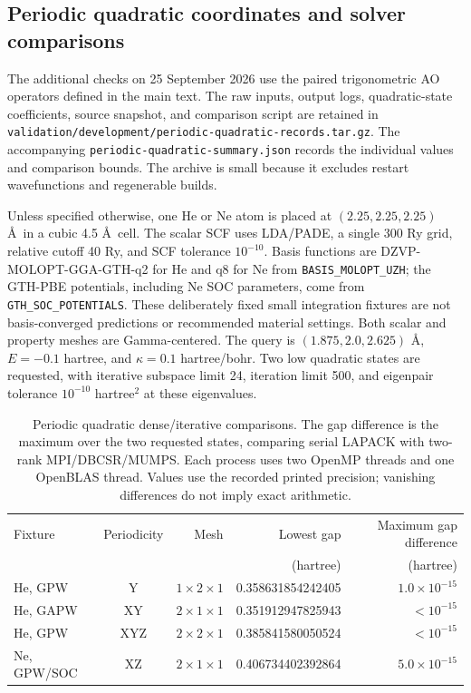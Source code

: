 \documentclass[11pt]{article}
\begin{document}
\subsection{Periodic quadratic coordinates and solver comparisons}
\label{sec:si-periodic-quadratic}
The additional checks on 25 September 2026 use the paired
trigonometric AO operators defined in the main text.
The raw inputs, output logs, quadratic-state coefficients,
source snapshot, and comparison script are retained in
\nolinkurl{validation/development/periodic-quadratic-records.tar.gz}.
The accompanying \texttt{periodic-quadratic-summary.json} records
the individual values and comparison bounds. The archive is small
because it excludes restart wavefunctions and regenerable builds.

Unless specified otherwise, one He or Ne atom is placed at
$(2.25,2.25,2.25)$ \AA\ in a cubic 4.5 \AA\ cell. The scalar SCF
uses LDA/PADE, a single 300 Ry grid, relative cutoff 40 Ry, and
SCF tolerance $10^{-10}$. Basis functions are
DZVP-MOLOPT-GGA-GTH-q2 for He and q8 for Ne from
\texttt{BASIS\_MOLOPT\_UZH}; the GTH-PBE potentials, including
Ne SOC parameters, come from \texttt{GTH\_SOC\_POTENTIALS}.
These deliberately fixed small integration fixtures are not
basis-converged predictions or recommended material settings.
Both scalar and property meshes are Gamma-centered.
The query is $(1.875,2.0,2.625)$ \AA, $E=-0.1$ hartree, and
$\kappa=0.1$ hartree/bohr. Two low quadratic states are requested,
with iterative subspace limit 24, iteration limit 500, and
eigenpair tolerance $10^{-10}$ hartree$^2$ at these eigenvalues.

\begin{table}[htbp]
\centering\small
\setlength{\tabcolsep}{4pt}
\begin{tabular}{lcrrr}
\toprule
Fixture & Periodicity & Mesh & Lowest gap & Maximum gap difference\\
 & & & (hartree) & (hartree)\\
\midrule
He, GPW & Y & $1\times2\times1$ & 0.358631854242405 & $1.0\times10^{-15}$\\
He, GAPW & XY & $2\times1\times1$ & 0.351912947825943 & $<10^{-15}$\\
He, GPW & XYZ & $2\times2\times1$ & 0.385841580050524 & $<10^{-15}$\\
Ne, GPW/SOC & XZ & $2\times1\times1$ & 0.406734402392864 & $5.0\times10^{-15}$\\
\bottomrule
\end{tabular}
\caption{Periodic quadratic dense/iterative comparisons. The gap
difference is the maximum over the two requested states, comparing
serial LAPACK with two-rank MPI/DBCSR/MUMPS. Each process uses two
OpenMP threads and one OpenBLAS thread. Values use the recorded
printed precision; vanishing differences do not imply exact arithmetic.}
\label{tab:si-periodic-quadratic}
\end{table}
\end{document}
